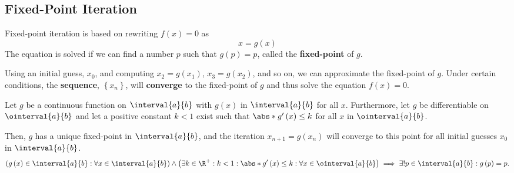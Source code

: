 \documentclass{article}
\begin{document}
\subsection{Fixed-Point Iteration}
Fixed-point iteration is based on rewriting \(f\left( x \right) = 0\) as
\begin{equation*}
    x = g\left( x \right)
\end{equation*}
The equation is solved if we can find a number \(p\) such that \(g\left( p \right) = p\),
called the \textbf{fixed-point} of \(g\).

Using an initial guess, \(x_0\), and computing \(x_2 = g\left( x_1 \right)\), \(x_3 = g\left( x_2 \right)\), and so on,
we can approximate the fixed-point of \(g\). Under certain conditions, the \textbf{sequence}, \(\left\{ x_n \right\}\),
will \textbf{converge} to the fixed-point of \(g\) and thus solve the equation \(f\left( x \right) = 0\).
\begin{theorem}
    Let \(g\) be a continuous function on \(\interval{a}{b}\) with \(g\left( x \right)\) in \(\interval{a}{b}\)
    for all \(x\). Furthermore, let \(g\) be differentiable on \(\ointerval{a}{b}\) and let a positive constant
    \(k < 1\) exist such that \(\abs*{g'\left( x \right)} \leq k\) for all \(x\) in \(\ointerval{a}{b}\).

    Then, \(g\) has a unique fixed-point in \(\interval{a}{b}\), and the iteration \(x_{n+1} = g\left( x_n \right)\)
    will converge to this point for all initial guesses \(x_0\) in \(\interval{a}{b}\).
    \begin{equation*}
        \left( g\left( x \right) \in \interval{a}{b} : \forall x \in \interval{a}{b} \right) \land \left( \exists k \in \R^+ : k < 1 : \abs*{g'\left( x \right)} \leq k : \forall x \in \ointerval{a}{b} \right) \implies \exists! p \in \interval{a}{b} : g\left( p \right) = p.
    \end{equation*}
\end{theorem}
\end{document}
